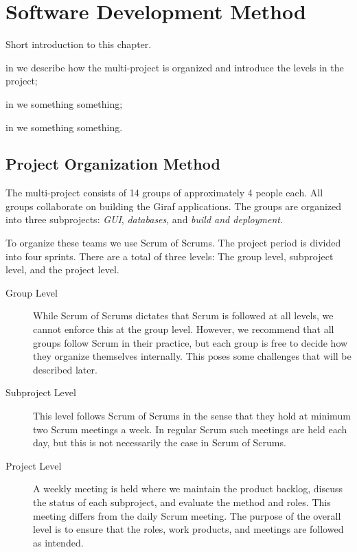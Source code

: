 \chapter{Software Development Method}\label{chap:sw_dev_method}
Short introduction to this chapter. \dummy~\dummy~\dummy~\dummy~\dummy~\dummy

\begin{chapterorganization}
  \item in  we describe how the multi-project is organized and introduce the levels in the project;
  \item in  we something something;
  \item in  we something something.
\end{chapterorganization}

\section{Project Organization Method}\label{sec:project_overview}
The multi-project consists of 14 groups of approximately 4 people each. All groups collaborate on building the Giraf applications. The groups are organized into three subprojects: \emph{GUI}, \emph{databases}, and \emph{build and deployment}.

To organize these teams we use Scrum of Scrums. The project period is divided into four sprints. There are a total of three levels: The group level, subproject level, and the project level.

\begin{description}
	\item[Group Level] While Scrum of Scrums dictates that Scrum is followed at all levels, we cannot enforce this at the group level. However, we recommend that all groups follow Scrum in their practice, but each group is free to decide how they organize themselves internally. This poses some challenges that will be described later.
	\item[Subproject Level] This level follows Scrum of Scrums in the sense that they hold at minimum two Scrum meetings a week. In regular Scrum such meetings are held each day, but this is not necessarily the case in Scrum of Scrums.
	\item[Project Level] A weekly meeting is held where we maintain the product backlog, discuss the status of each subproject, and evaluate the method and roles. This meeting differs from the daily Scrum meeting. The purpose of the overall level is to ensure that the roles, work products, and meetings are followed as intended.
\end{description}

